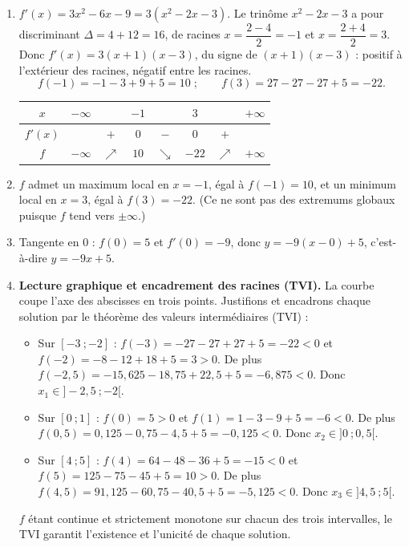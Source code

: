 \documentclass[11pt]{article}
\newcommand{\cle}[1]{{\popxbold\color{popdark}#1}}
\begin{document}
\begin{corrige}
\begin{enumerate}
\item $f'(x) = 3x^2 - 6x - 9 = 3(x^2 - 2x - 3)$. Le trinôme $x^2 - 2x - 3$ a pour discriminant $\Delta = 4 + 12 = 16$, de racines $x = \dfrac{2 - 4}{2} = -1$ et $x = \dfrac{2 + 4}{2} = 3$. Donc $f'(x) = 3(x+1)(x-3)$, du signe de $(x+1)(x-3)$ : positif à l'extérieur des racines, négatif entre les racines.
\[ f(-1) = -1 - 3 + 9 + 5 = 10 \;; \qquad f(3) = 27 - 27 - 27 + 5 = -22. \]
\begin{center}
\begin{tabular}{|c|ccccccc|}\hline
$x$ & $-\infty$ & & $-1$ & & $3$ & & $+\infty$ \\ \hline
$f'(x)$ & & $+$ & $0$ & $-$ & $0$ & $+$ & \\ \hline
$f$ & $-\infty$ & $\nearrow$ & $10$ & $\searrow$ & $-22$ & $\nearrow$ & $+\infty$ \\ \hline
\end{tabular}
\end{center}
\item $f$ admet un \cle{maximum local} en $x = -1$, égal à $f(-1) = 10$, et un \cle{minimum local} en $x = 3$, égal à $f(3) = -22$. (Ce ne sont pas des extremums globaux puisque $f$ tend vers $\pm\infty$.)
\item Tangente en $0$ : $f(0) = 5$ et $f'(0) = -9$, donc $y = -9(x - 0) + 5$, c'est-à-dire $\boxed{y = -9x + 5}$.
\item \textbf{Lecture graphique et encadrement des racines (TVI).} La courbe coupe l'axe des abscisses en trois points. Justifions et encadrons chaque solution par le théorème des valeurs intermédiaires (TVI) :
\begin{itemize}
\item Sur $[-3\ ; -2]$ : $f(-3) = -27 - 27 + 27 + 5 = -22 < 0$ et $f(-2) = -8 - 12 + 18 + 5 = 3 > 0$. De plus $f(-2{,}5) = -15{,}625 - 18{,}75 + 22{,}5 + 5 = -6{,}875 < 0$. Donc $x_1 \in ]-2{,}5\ ; -2[$.
\item Sur $[0\ ; 1]$ : $f(0) = 5 > 0$ et $f(1) = 1 - 3 - 9 + 5 = -6 < 0$. De plus $f(0{,}5) = 0{,}125 - 0{,}75 - 4{,}5 + 5 = -0{,}125 < 0$. Donc $x_2 \in ]0\ ; 0{,}5[$.
\item Sur $[4\ ; 5]$ : $f(4) = 64 - 48 - 36 + 5 = -15 < 0$ et $f(5) = 125 - 75 - 45 + 5 = 10 > 0$. De plus $f(4{,}5) = 91{,}125 - 60{,}75 - 40{,}5 + 5 = -5{,}125 < 0$. Donc $x_3 \in ]4{,}5\ ; 5[$.
\end{itemize}
$f$ étant continue et strictement monotone sur chacun des trois intervalles, le TVI garantit l'existence et l'unicité de chaque solution.
\end{enumerate}
\end{corrige}
\end{document}

